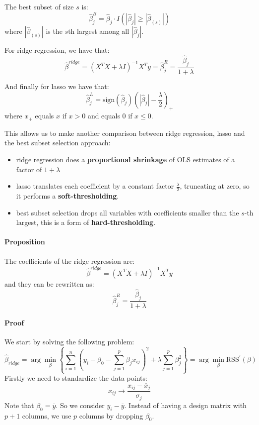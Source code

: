The best subset of size $s$ is:
\[
    \hat{\beta}_j^B = \hat{\beta}_j \cdot I(|\hat{\beta}_j| \geq |\hat{\beta}_{(s)}|)
\]
where $|\hat{\beta}_{(s)}|$ is the $s$th largest among all $|\hat{\beta}_j|$.

For ridge regression, we have that:
\[
    \hat{\beta}^{ridge} = \left(X^T X + \lambda I\right)^{-1} X^T y = \hat{\beta}_j^R = \frac{\hat{\beta}_j}{1 + \lambda}
\]

And finally for lasso we have that:
\[
    \hat{\beta}_j^L = \text{sign}(\hat{\beta}_j)\left(|\hat{\beta}_j| - \frac{\lambda }{2}\right)_+
\]
where $x_+$ equals $x$ if $x>0$ and equals $0$ if $x\leq 0$.

This allows us to make another comparison between ridge regression, lasso and the best subset selection approach:
\begin{itemize}
    \item ridge regression does a \textbf{proportional shrinkage} of OLS estimates of a factor of $1+\lambda$
    \item lasso translates each coefficient by a constant factor $\frac{\lambda}{2}$, truncating at zero, so it performs a \textbf{soft-thresholding}.
    \item best subset selection drops all variables with coefficients smaller than the $s$-th largest, this is a form of \textbf{hard-thresholding}.
\end{itemize}

\paragraph*{Proposition}
The coefficients of the ridge regression are:
\[
    \hat{\beta}^{ridge} = \left(X^T X + \lambda I\right)^{-1} X^T y
\]
and they can be rewritten as:
\[
    \hat{\beta}_j^R = \frac{\hat{\beta}_j}{1 + \lambda}
\]


\paragraph*{Proof}
We start by solving the following problem:
\[
    \hat{\beta}_{ridge} = \arg\min_\beta  \left\{ \sum_{i=1}^n (y_i - \beta_0 - \sum_{j = 1}^p \beta_j x_{ij})^2  + \lambda\sum_{j = 1}^p \beta_j^2 \right\} = \arg\min_\beta \text{RSS}^{\prime} (\beta)
\]
Firstly we need to standardize the data points:
\[
    x_{ij} \to \frac{x_{ij} - \overline{x}_j}{\sigma_j}
\]
Note that $\beta_0 = \overline{y}$. So we consider $y_i - \overline{y}$. Instead of having a design matrix with $p+1$ columns, we use $p$ columns by dropping $\beta_0$.

